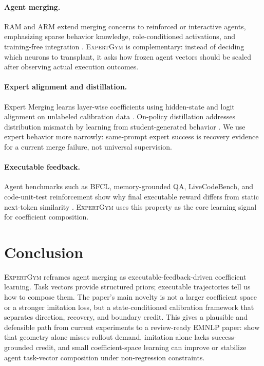 \documentclass[11pt]{article}
\newcommand{\method}{\textsc{ExpertGym}\xspace}
\begin{document}
\paragraph{Agent merging.}  RAM and ARM extend merging concerns to reinforced or interactive agents, emphasizing sparse behavior knowledge, role-conditioned activations, and training-free integration \citep{yuan2026ram,feng2026arm}.  \method is complementary: instead of deciding which neurons to transplant, it asks how frozen agent vectors should be scaled after observing actual execution outcomes.

\paragraph{Expert alignment and distillation.}  Expert Merging learns layer-wise coefficients using hidden-state and logit alignment on unlabeled calibration data \citep{zhang2025expertmerging}.  On-policy distillation addresses distribution mismatch by learning from student-generated behavior \citep{agarwal2024gkd}.  We use expert behavior more narrowly: same-prompt expert success is recovery evidence for a current merge failure, not universal supervision.

\paragraph{Executable feedback.}  Agent benchmarks such as BFCL, memory-grounded QA, LiveCodeBench, and code-unit-test reinforcement show why final executable reward differs from static next-token similarity \citep{patil2025bfcl,yang2018hotpotqa,jain2025livecodebench,wang2025cure}.  \method uses this property as the core learning signal for coefficient composition.

\section{Conclusion}

\method reframes agent merging as executable-feedback-driven coefficient learning.  Task vectors provide structured priors; executable trajectories tell us how to compose them.  The paper's main novelty is not a larger coefficient space or a stronger imitation loss, but a state-conditioned calibration framework that separates direction, recovery, and boundary credit.  This gives a plausible and defensible path from current experiments to a review-ready EMNLP paper: show that geometry alone misses rollout demand, imitation alone lacks success-grounded credit, and small coefficient-space learning can improve or stabilize agent task-vector composition under non-regression constraints.
\end{document}
